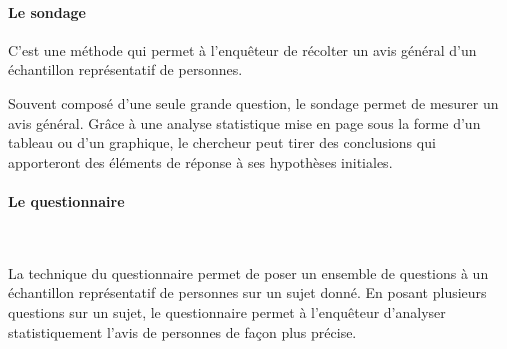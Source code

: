 \paragraph{Le sondage} 

\noindent

	C’est une méthode qui permet à l'enquêteur de récolter un avis général d’un échantillon représentatif de personnes. 

\noindent

Souvent composé d’une seule grande question, le sondage permet de mesurer un avis général. Grâce à une analyse statistique mise en page sous la forme d’un tableau ou d’un graphique, le chercheur peut tirer des conclusions qui apporteront des éléments de réponse à ses hypothèses initiales.

\paragraph{Le questionnaire } ~~\\

\noindent

	La technique du questionnaire permet de poser un ensemble de questions à un échantillon représentatif de personnes sur un sujet donné.
En posant plusieurs questions sur un sujet, le questionnaire permet à l’enquêteur d’analyser statistiquement l’avis de personnes de façon plus précise.

